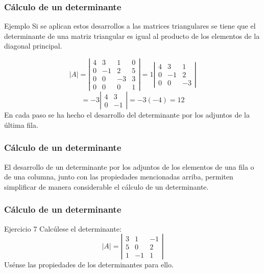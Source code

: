 \documentclass[aspectratio=169]{beamer}
\begin{document}
\begin{frame}
  \frametitle{C\'alculo de un determinante}
     \begin{block}{Ejemplo}
     Si se aplican estos desarrollos a las matrices triangulares se tiene que el determinante de una matriz triangular es igual al producto de los elementos de la diagonal principal.

\end{block}

\[|A| = \left|\begin{array}{cccc}4 & 3 & 1 & 0 \\0 & -1 & 2 & 5 \\0 & 0 & -3 & 3  \\0 & 0 & 0 & 1\end{array}\right| = 
 1\left|\begin{array}{cccc}4 & 3 & 1  \\0 & -1 & 2 \\0 & 0 & -3 \end{array}\right|\]
 \[
 =  -3\left|\begin{array}{cccc}4 & 3   \\0 & -1  \end{array}\right|
 =  -3(-4) = 12
 \]
En cada paso se ha hecho el desarrollo del determinante por los adjuntos de la \'ultima fila.
\end{frame} 



\begin{frame}
  \frametitle{C\'alculo de un determinante}
El desarrollo de un determinante por los adjuntos de los elementos de una fila o de una columna, junto con las propiedades mencionadas arriba, permiten simplificar de manera considerable el c\'alculo de un determinante.
\end{frame} 


\begin{frame}
  \frametitle{C\'alculo de un determinante}
     \begin{block}{Ejercicio 7}
Calc\'ulese el determinante:
\[|A| = \left|\begin{array}{ccc}3 & 1 & -1 \\5 & 0 & 2 \\1 & -1 & 1\end{array}\right|\]
Us\'ense las propiedades de los determinantes para ello.
\end{block}
\end{frame} 
\end{document}
